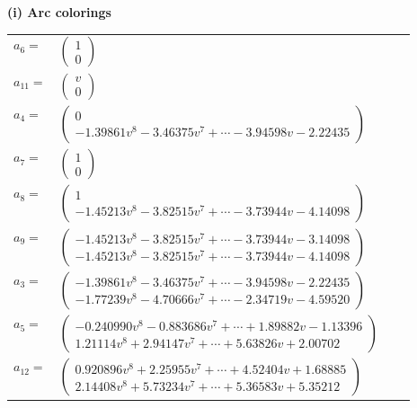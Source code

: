 \documentclass[1p]{elsarticle_modified}
\theoremstyle{definition}
\begin{document}
\flushleft \textbf{(i) Arc colorings}\\
\begin{tabular}{m{7pt} m{180pt} m{7pt} m{180pt} }
\flushright $a_{6}=$&$\begin{pmatrix}1\\0\end{pmatrix}$ \\
\flushright $a_{11}=$&$\begin{pmatrix}v\\0\end{pmatrix}$ \\
\flushright $a_{4}=$&$\begin{pmatrix}0\\-1.39861 v^{8}-3.46375 v^{7}+\cdots-3.94598 v-2.22435\end{pmatrix}$ \\
\flushright $a_{7}=$&$\begin{pmatrix}1\\0\end{pmatrix}$ \\
\flushright $a_{8}=$&$\begin{pmatrix}1\\-1.45213 v^{8}-3.82515 v^{7}+\cdots-3.73944 v-4.14098\end{pmatrix}$ \\
\flushright $a_{9}=$&$\begin{pmatrix}-1.45213 v^{8}-3.82515 v^{7}+\cdots-3.73944 v-3.14098\\-1.45213 v^{8}-3.82515 v^{7}+\cdots-3.73944 v-4.14098\end{pmatrix}$ \\
\flushright $a_{3}=$&$\begin{pmatrix}-1.39861 v^{8}-3.46375 v^{7}+\cdots-3.94598 v-2.22435\\-1.77239 v^{8}-4.70666 v^{7}+\cdots-2.34719 v-4.59520\end{pmatrix}$ \\
\flushright $a_{5}=$&$\begin{pmatrix}-0.240990 v^{8}-0.883686 v^{7}+\cdots+1.89882 v-1.13396\\1.21114 v^{8}+2.94147 v^{7}+\cdots+5.63826 v+2.00702\end{pmatrix}$ \\
\flushright $a_{12}=$&$\begin{pmatrix}0.920896 v^{8}+2.25955 v^{7}+\cdots+4.52404 v+1.68885\\2.14408 v^{8}+5.73234 v^{7}+\cdots+5.36583 v+5.35212\end{pmatrix}$ \\

\end{tabular}
\end{document}

